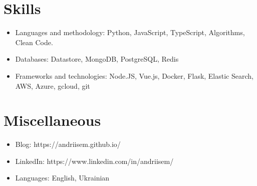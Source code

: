 \documentclass{resume}
\begin{document}
\section{Skills}
\begin{itemize}[parsep=0.5ex]
    \item Languages and methodology: Python, JavaScript, TypeScript, Algorithms, Clean Code.
    \item Databases: Datastore, MongoDB, PostgreSQL, Redis
    \item Frameworks and technologies: Node.JS, Vue.js, Docker, Flask, Elastic Search, AWS, Azure, gcloud, git
\end{itemize}

\section{Miscellaneous}
\begin{itemize}[parsep=0.5ex]
  \item Blog: https://andriisem.github.io/
  \item LinkedIn: https://www.linkedin.com/in/andriisem/
  \item Languages: English, Ukrainian
\end{itemize}
\end{document}
